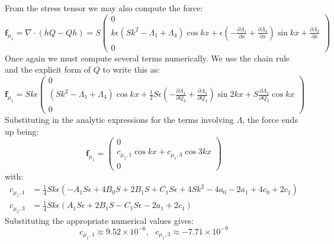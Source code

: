 \documentclass[reqno]{article}
\begin{document}
From the stress tensor we may also compute the force:
\begin{equation}
  \mathbf{f}_{\mu_1}
  =
  \nabla \cdot (hQ - Qh)
  =
  S
  \begin{pmatrix}
    0 \\
    k \epsilon \left( S k^2 - \Lambda_1 + \Lambda_4 \right) \cos kx
    + \epsilon \left( -\frac{\partial \Lambda_1}{\partial x} + \frac{\partial \Lambda_4}{\partial x}  \right) \sin kx
    + \frac{\partial \Lambda_2}{\partial x} \\
    0
  \end{pmatrix}
\end{equation}
Once again we must compute several terms numerically.
We use the chain rule and the explicit form of $Q$ to write this as:
\begin{equation}
  \mathbf{f}_{\mu_1}
  =
  S k \epsilon
  \begin{pmatrix}
    0 \\
    \left( S k^2 - \Lambda_1 + \Lambda_4 \right) \cos kx
    + \tfrac12 S \epsilon \left( -\frac{\partial \Lambda_1}{\partial Q_2} + \frac{\partial \Lambda_4}{\partial Q_2}  \right) \sin 2 kx
    + S \frac{\partial \Lambda_2}{\partial Q_2} \cos kx \\
    0
  \end{pmatrix}
\end{equation}
Substituting in the analytic expressions for the terms involving $\Lambda$,
the force ends up being:
\begin{equation}
  \mathbf{f}_{\mu_1}
  =
  \begin{pmatrix}
    0 \\
    c_{\mu_1, 1} \cos kx + c_{\mu_1, 3} \cos 3kx \\
    0
  \end{pmatrix}
\end{equation}
with:
\begin{align}
  c_{\mu_1, 1}
  &=
    \tfrac14 S k \epsilon \left(- A_{1} S \epsilon + 4 B_{0} S + 2 B_{1} S + C_{1} S \epsilon + 4 S k^{2} - 4 a_{0} - 2 a_{1} + 4 c_{0} + 2 c_{1}\right) \\
  c_{\mu_1, 3}
  &=
    \tfrac14 S k \epsilon \left(A_{1} S \epsilon + 2 B_{1} S - C_{1} S \epsilon - 2 a_{1} + 2 c_{1}\right)
\end{align}
Substituting the appropriate numerical values gives:
\begin{equation}
  c_{\mu_1, 1} \approx 9.52 \times 10^{-6}, \:\:\:
  c_{\mu_1, 3} \approx -7.71 \times 10^{-9}
\end{equation}
\end{document}
